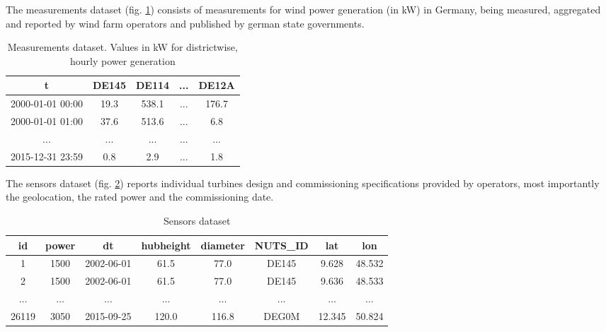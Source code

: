 The measurements dataset (fig. \ref{table:measurements-dataset}) consists of measurements for wind power generation (in kW) in Germany, being measured, aggregated and reported by wind farm operators and published by german state governments.

\begin{table}[H]
\centering
\caption{Measurements dataset. Values in kW for districtwise, hourly power generation} \label{table:measurements-dataset}
\begin{tabular}{lcccc}
\hline
\multicolumn{1}{c}{t}   & DE145 & DE114 & ... & DE12A \\ \hline
2000-01-01 00:00        & 19.3  & 538.1 & ... & 176.7 \\
2000-01-01 01:00        & 37.6  & 513.6 & ... & 6.8   \\
\multicolumn{1}{c}{...} & ...   & ...   & ... & ...   \\
2015-12-31 23:59        & 0.8   & 2.9   & ... & 1.8   \\ \hline
\end{tabular}
\end{table}

The sensors dataset (fig. \ref{table:sensors-dataset}) reports individual turbines design and commissioning specifications provided by operators, most importantly the geolocation, the rated power and the commissioning date.

\begin{table}[]
\centering
\caption{Sensors dataset} \label{table:sensors-dataset}
\begin{tabular}{cccccccc}
\hline
\textbf{id} & \textbf{power} & \textbf{dt} & \textbf{hubheight} & \textbf{diameter} & \textbf{NUTS\_ID}& \textbf{lat} & \textbf{lon} \\ \hline
1                            & 1500                            & 2002-06-01                   & 61.5                                & 77.0                               & DE145                              & 9.628                         & 48.532                        \\
2                            & 1500                            & 2002-06-01                   & 61.5                                & 77.0                               & DE145                              & 9.636                         & 48.533                        \\
$\dots$                      & $\dots$                         & $\dots$                      & $\dots$                             & $\dots$                            & $\dots$                            & $\dots$                       & $\dots$                       \\
26119                        & 3050                            & 2015-09-25                   & 120.0                               & 116.8                              & DEG0M                              & 12.345                        & 50.824                        \\ \hline
\end{tabular}
\end{table}

